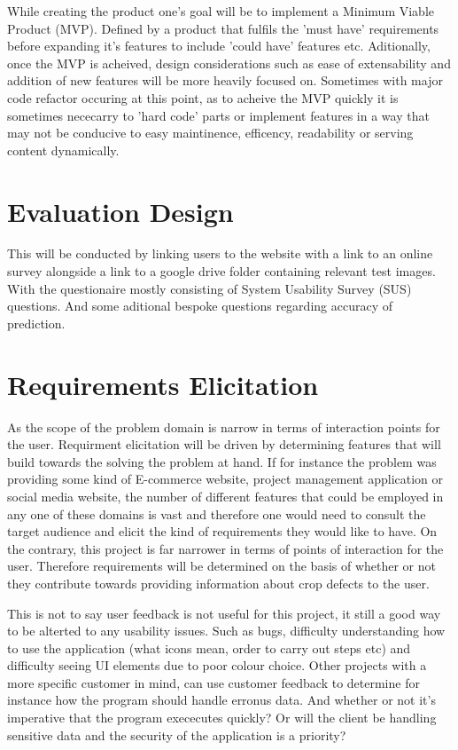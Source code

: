 While creating the product one's goal will be to implement a Minimum Viable Product (MVP). Defined by a product that fulfils the 'must have' requirements before expanding it's features to include 'could have' features etc. Aditionally, once the MVP is acheived, design considerations such as ease of extensability and addition of new features will be more heavily focused on. Sometimes with major code refactor occuring at this point, as to acheive the MVP quickly it is sometimes nececarry to 'hard code' parts or implement features in a way that may not be conducive to easy maintinence, efficency, readability or serving content dynamically.

\section{Evaluation Design}
  This will be conducted by linking users to the website with a link to an online survey alongside a link to a google drive folder containing relevant test images. With the questionaire mostly consisting of System Usability Survey (SUS) questions. And some aditional bespoke questions regarding accuracy of prediction.
\section{Requirements Elicitation}
  As the scope of the problem domain is narrow in terms of interaction points for the user. Requirment elicitation will be driven by determining features that will build towards the solving the problem at hand. If for instance the problem was providing some kind of E-commerce website, project management application or social media website, the number of different features that could be employed in any one of these domains is vast and therefore one would need to consult the target audience and elicit the kind of requirements they would like to have. On the contrary, this project is far narrower in terms of points of interaction for the user. Therefore requirements will be determined on the basis of whether or not they contribute towards providing information about crop defects to the user.
  \par
  This is not to say user feedback is not useful for this project, it still a good way to be alterted to any usability issues. Such as bugs, difficulty understanding how to use the application (what icons mean, order to carry out steps etc) and difficulty seeing UI elements due to poor colour choice. Other projects with a more specific customer in mind, can use customer feedback to determine for instance how the program should handle erronus data. And whether or not it's imperative that the program exececutes quickly? Or will the client be handling sensitive data and the security of the application is a priority?

